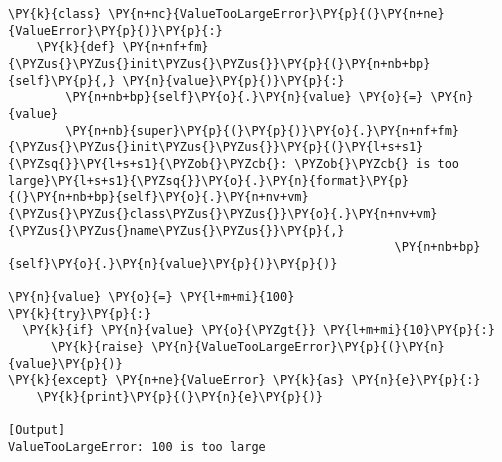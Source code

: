 \begin{Verbatim}[label=\makebox{\url{https://github.com/lucabaldini/cmepda/tree/master/slides/latex/snippets/custom\_exceptions\_2.py}},commandchars=\\\{\}]
\PY{k}{class} \PY{n+nc}{ValueTooLargeError}\PY{p}{(}\PY{n+ne}{ValueError}\PY{p}{)}\PY{p}{:}
    \PY{k}{def} \PY{n+nf+fm}{\PYZus{}\PYZus{}init\PYZus{}\PYZus{}}\PY{p}{(}\PY{n+nb+bp}{self}\PY{p}{,} \PY{n}{value}\PY{p}{)}\PY{p}{:}
        \PY{n+nb+bp}{self}\PY{o}{.}\PY{n}{value} \PY{o}{=} \PY{n}{value}
        \PY{n+nb}{super}\PY{p}{(}\PY{p}{)}\PY{o}{.}\PY{n+nf+fm}{\PYZus{}\PYZus{}init\PYZus{}\PYZus{}}\PY{p}{(}\PY{l+s+s1}{\PYZsq{}}\PY{l+s+s1}{\PYZob{}\PYZcb{}: \PYZob{}\PYZcb{} is too large}\PY{l+s+s1}{\PYZsq{}}\PY{o}{.}\PY{n}{format}\PY{p}{(}\PY{n+nb+bp}{self}\PY{o}{.}\PY{n+nv+vm}{\PYZus{}\PYZus{}class\PYZus{}\PYZus{}}\PY{o}{.}\PY{n+nv+vm}{\PYZus{}\PYZus{}name\PYZus{}\PYZus{}}\PY{p}{,}
                                                      \PY{n+nb+bp}{self}\PY{o}{.}\PY{n}{value}\PY{p}{)}\PY{p}{)}

\PY{n}{value} \PY{o}{=} \PY{l+m+mi}{100}
\PY{k}{try}\PY{p}{:}
  \PY{k}{if} \PY{n}{value} \PY{o}{\PYZgt{}} \PY{l+m+mi}{10}\PY{p}{:}
      \PY{k}{raise} \PY{n}{ValueTooLargeError}\PY{p}{(}\PY{n}{value}\PY{p}{)}
\PY{k}{except} \PY{n+ne}{ValueError} \PY{k}{as} \PY{n}{e}\PY{p}{:}
    \PY{k}{print}\PY{p}{(}\PY{n}{e}\PY{p}{)}

[Output]
ValueTooLargeError: 100 is too large
\end{Verbatim}